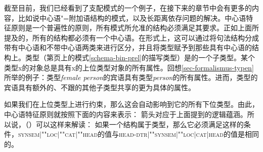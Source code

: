 截至目前，我们已经看到了支配模式的一个例子，在接下来的章节中会有更多的内容，比如说中心语"=附加语结构的模式，以及长距离依存问题的解决。中心语特征原则是一个普遍性的原则，所有模式所允准的结构必须满足其要求。正如上面所提及的，所有的结构都必须有一个中心语。在形式上，这可以通过将句法结构分成带有中心语和不带中心语两类来进行区分，并且将类型赋予到那些具有中心语的结构上。类型（第\pageref{schema-bin-prel}页上的模式\ref{schema-bin-prel}的描写类型）是的一个子类型。某个类型x的对象总是具有x的上位类型对象的所有属性。回想\ref{sec-formalismus-typen}所举的例子：类型\textit{female person}的宾语具有类型\textit{person}的所有属性。进而，类型的宾语具有额外的、不跟的其他子类型共享的更为具体的属性。

如果我们在上位类型上进行约束，那么这会自动影响到它的所有下位类型。由此，中心语特征原则就按照下面的内容来表示：
\ea
{} \impl
{} 
\z
箭头\isc{\impl}\is{\impl}对应于上面提到的逻辑蕴涵。所以说，（）可以这样来解读：
如果一个结构属于类型，那么它必须满足这样的条件，\textsc{synsem$|$""loc$|$""cat$|$""head}的值与\textsc{head-dtr$|$""synsem$|$""loc$|$cat$|$head}的值是相同的。


